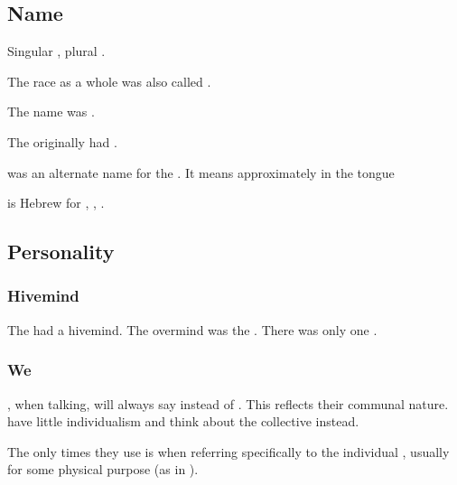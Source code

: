 \subsection{Name}
Singular \emph{\bane{}}, plural \emph{\banes{}}. 

The \bane{} race as a whole was also called . 

The name \quo{\bane} was . 

The \dragons originally had . 

\emph{\SitraAchras} was an alternate \resphan name for the \banes. 
It means approximately  in the \Resphan tongue 

\emph{\SitraAchra} is Hebrew for , , . 









\subsection{Personality}





\subsubsection{Hivemind}
The \banes had a hivemind. 
The overmind was the \baneking \Voidbringer.
There was only one \baneking. 





\subsubsection{We}
\Banelords, when talking, will always say  instead of . 
This reflects their communal nature. 
\Banelords{} have little individualism and think about the collective instead. 

The only times they use  is when referring specifically to the individual \banelord, usually for some physical purpose 
(as in ). 









